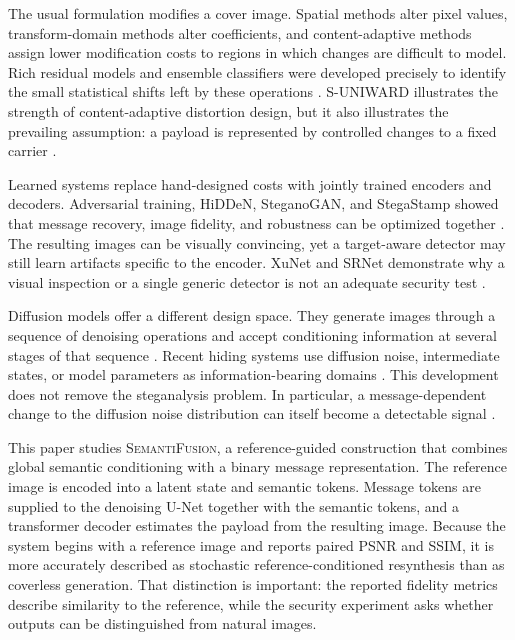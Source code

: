 \documentclass[pdflatex,sn-mathphys-num]{sn-jnl}
\newcommand{\method}{\textsc{SemantiFusion}}
\begin{document}
The usual formulation modifies a cover image. Spatial methods alter pixel values, transform-domain methods alter coefficients, and content-adaptive methods assign lower modification costs to regions in which changes are difficult to model. Rich residual models and ensemble classifiers were developed precisely to identify the small statistical shifts left by these operations \cite{fridrich2012rich,kodovsky2012ensemble}. S-UNIWARD illustrates the strength of content-adaptive distortion design, but it also illustrates the prevailing assumption: a payload is represented by controlled changes to a fixed carrier \cite{holub2014universal}.

Learned systems replace hand-designed costs with jointly trained encoders and decoders. Adversarial training, HiDDeN, SteganoGAN, and StegaStamp showed that message recovery, image fidelity, and robustness can be optimized together \cite{hayes2017generating,zhu2018hidden,zhang2019steganogan,tancik2020stegastamp}. The resulting images can be visually convincing, yet a target-aware detector may still learn artifacts specific to the encoder. XuNet and SRNet demonstrate why a visual inspection or a single generic detector is not an adequate security test \cite{xu2016structural,boroumand2019deep}.

Diffusion models offer a different design space. They generate images through a sequence of denoising operations and accept conditioning information at several stages of that sequence \cite{ho2020denoising,song2021ddim,rombach2022highresolution}. Recent hiding systems use diffusion noise, intermediate states, or model parameters as information-bearing domains \cite{yu2023cross,peng2024ldstega,kim2025diffusionstego,chen2025hiding}. This development does not remove the steganalysis problem. In particular, a message-dependent change to the diffusion noise distribution can itself become a detectable signal \cite{zhu2026rethinking}.

This paper studies \method, a reference-guided construction that combines global semantic conditioning with a binary message representation. The reference image is encoded into a latent state and semantic tokens. Message tokens are supplied to the denoising U-Net together with the semantic tokens, and a transformer decoder estimates the payload from the resulting image. Because the system begins with a reference image and reports paired PSNR and SSIM, it is more accurately described as stochastic reference-conditioned resynthesis than as coverless generation. That distinction is important: the reported fidelity metrics describe similarity to the reference, while the security experiment asks whether outputs can be distinguished from natural images.
\end{document}
